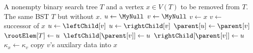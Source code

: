 
\begin{algorithmic}[1]
\Require A nonempty binary search tree $T$ and a vertex $x \in V(T)$ to
  be removed from $T$.
\Ensure The same BST $T$ but without $x$.
\State $u \gets \MyNull$
\State $v \gets \MyNull$
  \State $v \gets x$
\Else
  \State $v \gets$ successor of $x$
\EndIf
\If{$\leftChild[v] \neq \MyNull$}
  \State $u \gets \leftChild[v]$
\Else
  \State $u \gets \rightChild[v]$
\EndIf
{}
  \State $\parent[u] \gets \parent[v]$
\EndIf
\If{$\parent[v] = \MyNull$}
  \State $\rootElem[T] \gets u$
\Else
    \State $\leftChild[\parent[v]] \gets u$
  \Else
    \State $\rightChild[\parent[v]] \gets u$
  \EndIf
\EndIf
{}
  \State $\kappa_x \gets \kappa_v$
  \State copy $v$'s auxilary data into $x$
\EndIf
\end{algorithmic}
